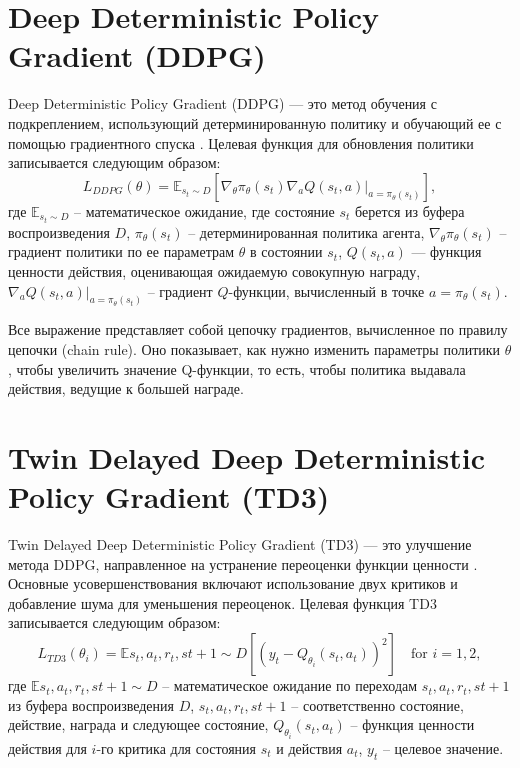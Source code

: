 \section{Deep Deterministic Policy Gradient (DDPG)}
Deep Deterministic Policy Gradient (DDPG) — это метод обучения с подкреплением, 
использующий детерминированную политику и обучающий ее с помощью градиентного спуска \cite{lib:rlmethods}. 
Целевая функция для обновления политики записывается следующим образом:
\begin{equation}
L_{DDPG}(\theta) = \mathbb{E}_{s_t \sim D} \left[ \nabla_\theta \pi_\theta(s_t) \nabla_a Q(s_t, a)|_{a=\pi_\theta(s_t)} \right],
\end{equation}
где 
$\mathbb{E}_{s_t \sim D}$ -- математическое ожидание, где состояние $s_t$ берется из буфера воспроизведения $D$,
$\pi_\theta(s_t)$ -- детерминированная политика агента,
$\nabla_\theta \pi_\theta(s_t)$ -- градиент политики по ее параметрам $\theta$ в состоянии $s_t$,
$Q(s_t, a)$ — функция ценности действия, оценивающая ожидаемую совокупную награду,
$\nabla_a Q(s_t, a)|_{a=\pi_\theta(s_t)}$ -- градиент $Q$-функции, вычисленный в точке $a=\pi_\theta(s_t)$.

Все выражение представляет собой цепочку градиентов, вычисленное по правилу цепочки (chain rule). 
Оно показывает, как нужно изменить параметры политики $\theta$,
чтобы увеличить значение Q-функции, то есть, чтобы политика выдавала действия, ведущие к большей награде.

\section{Twin Delayed Deep Deterministic Policy Gradient (TD3)}
Twin Delayed Deep Deterministic Policy Gradient (TD3) — это улучшение метода DDPG, 
направленное на устранение переоценки функции ценности \cite{lib:rlmethods}. 
Основные усовершенствования включают использование двух критиков и добавление шума для уменьшения переоценок. 
Целевая функция TD3 записывается следующим образом:
\begin{equation}
L_{TD3}(\theta_i) = \mathbb{E}{s_t, a_t, r_t, s{t+1} \sim D} \left[ \left( y_t - Q_{\theta_i}(s_t, a_t) \right)^2 \right] \quad \text{for } i = 1, 2,
\end{equation}
где 
$\mathbb{E}{s_t, a_t, r_t, s{t+1} \sim D}$ -- математическое ожидание по переходам ${s_t, a_t, r_t, s{t+1}}$ из буфера воспроизведения $D$,
${s_t, a_t, r_t, s{t+1}}$ -- соответственно состояние, действие, награда и следующее состояние,
$Q_{\theta_i}(s_t, a_t)$ -- функция ценности действия для $i$-го критика для состояния $s_t$ и действия $a_t$,
$y_t$ -- целевое значение.

